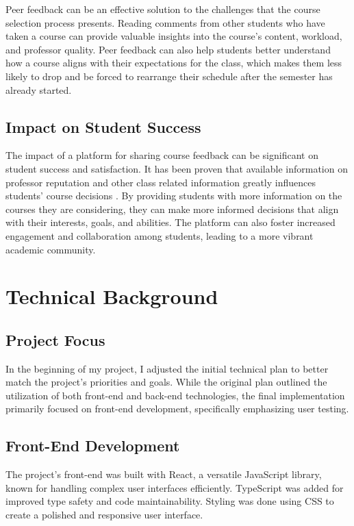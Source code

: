 \documentclass[10pt,twocolumn]{article}
\begin{document}
Peer feedback can be an effective solution to the challenges that the course selection process presents. Reading comments from other students who have taken a course can provide valuable insights into the course's content, workload, and professor quality. Peer feedback can also help students better understand how a course aligns with their expectations for the class, which makes them less likely to drop and be forced to rearrange their schedule after the semester has already started.

\subsection{Impact on Student Success}
The impact of a platform for sharing course feedback can be significant on student success and satisfaction. It has been proven that available information on professor reputation and other class related information greatly influences students' course decisions \cite{brown15}. By providing students with more information on the courses they are considering, they can make more informed decisions that align with their interests, goals, and abilities. The platform can also foster increased engagement and collaboration among students, leading to a more vibrant academic community.


\section{Technical Background}
\subsection{Project Focus}
In the beginning of my project, I adjusted the initial technical plan to better match the project's priorities and goals. While the original plan outlined the utilization of both front-end and back-end technologies, the final implementation primarily focused on front-end development, specifically emphasizing user testing.

\subsection{Front-End Development}
The project's front-end was built with React, a versatile JavaScript library, known for handling complex user interfaces efficiently. TypeScript was added for improved type safety and code maintainability. Styling was done using CSS to create a polished and responsive user interface.
\end{document}
